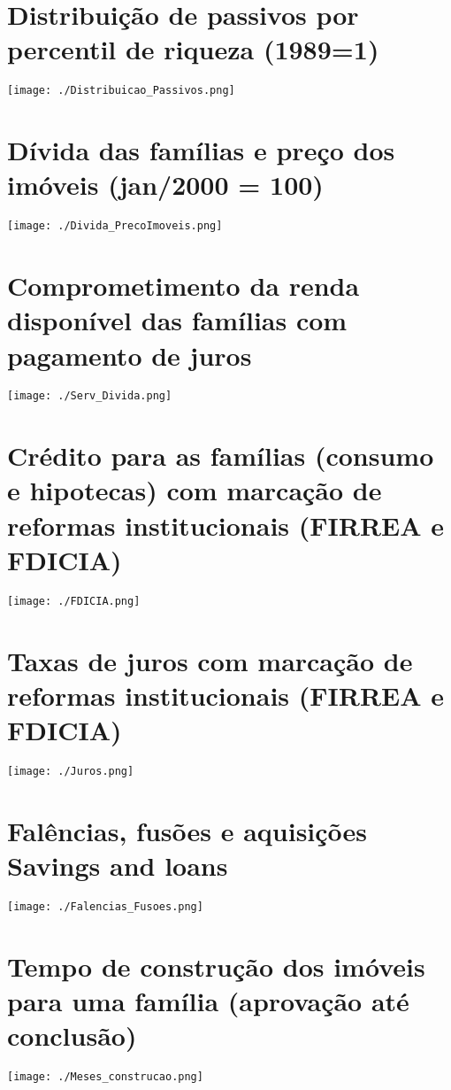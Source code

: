 \documentclass[11pt]{article}
\begin{document}
\section*{Distribuição de passivos por percentil de riqueza (1989=1)}
\label{sec:orgd764dab}

\begin{center}
\texttt{[image: ./Distribuicao\_Passivos.png]}
\end{center}

\section*{Dívida das famílias e preço dos imóveis (jan/2000 = 100)}
\label{sec:org8ff0aa3}

\begin{center}
\texttt{[image: ./Divida\_PrecoImoveis.png]}
\end{center}

\section*{Comprometimento da renda disponível das famílias com pagamento de juros}
\label{sec:orga723971}

\begin{center}
\texttt{[image: ./Serv\_Divida.png]}
\end{center}

\section*{Crédito para as famílias (consumo e hipotecas) com marcação de reformas institucionais (FIRREA e FDICIA)}
\label{sec:org9e99129}

\begin{center}
\texttt{[image: ./FDICIA.png]}
\end{center}

\section*{Taxas de juros com marcação de reformas institucionais (FIRREA e FDICIA)}
\label{sec:org42e78d9}

\begin{center}
\texttt{[image: ./Juros.png]}
\end{center}

\section*{Falências, fusões e aquisições Savings and loans}
\label{sec:org11dbd11}

\begin{center}
\texttt{[image: ./Falencias\_Fusoes.png]}
\end{center}

\section*{Tempo de construção dos imóveis para uma família (aprovação até conclusão)}
\label{sec:org7716838}

\begin{center}
\texttt{[image: ./Meses\_construcao.png]}
\end{center}
\end{document}
